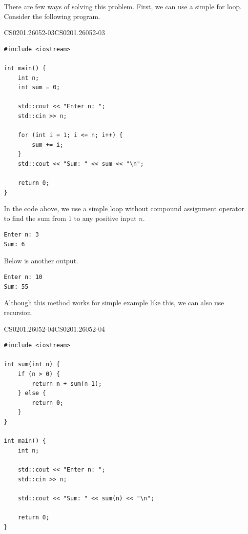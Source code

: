 \documentclass[../../main.tex]{subfiles}
\begin{document}
\begin{solution}
There are few ways of solving this problem. First, we can use a
simple for loop. Consider the following program.

\begin{cppboxSolution}{CS0201.26052-03}{CS0201.26052-03}
\begin{lstlisting}[style=cppstyle]
#include <iostream>

int main() {
    int n;
    int sum = 0;

    std::cout << "Enter n: ";
    std::cin >> n;

    for (int i = 1; i <= n; i++) {
        sum += i;
    }
    std::cout << "Sum: " << sum << "\n";

    return 0;
}
\end{lstlisting}
\end{cppboxSolution}

In the code above, we use a simple loop without compound assignment
operator to find the sum from $1$ to any positive input $n$.

\begin{outputboxSolution}
\begin{lstlisting}[style=basic]
Enter n: 3
Sum: 6
\end{lstlisting}
\end{outputboxSolution}

Below is another output.

\begin{outputboxSolution}
\begin{lstlisting}[style=basic]
Enter n: 10
Sum: 55
\end{lstlisting}
\end{outputboxSolution}

Although this method works for simple example like this, we can also
use recursion.

\begin{cppboxSolution}{CS0201.26052-04}{CS0201.26052-04}
\begin{lstlisting}[style=cppstyle]
#include <iostream>

int sum(int n) {
    if (n > 0) {
        return n + sum(n-1);
    } else {
        return 0;
    }
}

int main() {
    int n;

    std::cout << "Enter n: ";
    std::cin >> n;
    
    std::cout << "Sum: " << sum(n) << "\n";

    return 0;
}
\end{lstlisting}
\end{cppboxSolution}


\end{solution}
\end{document}
